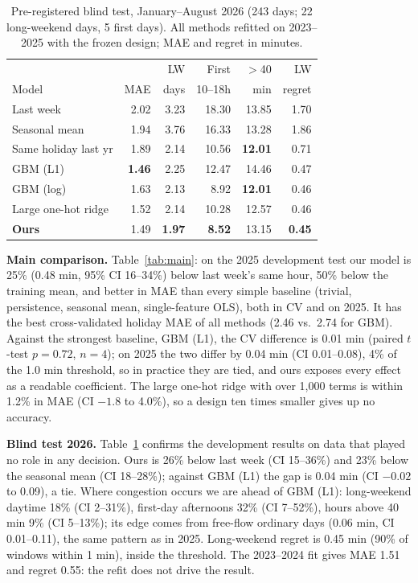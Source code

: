 \documentclass[11pt]{article}
\newcommand{\tb}{\footnotesize}
\begin{document}
\begin{table}[t]\tb\centering\setlength{\tabcolsep}{2.2pt}
\begin{tabular}{@{}lrrrrr@{}}
\toprule & & LW & First & $>$40 & LW\\
Model & MAE & days & 10--18h & min & regret\\\midrule
Last week & 2.02 & 3.23 & 18.30 & 13.85 & 1.70\\
Seasonal mean & 1.94 & 3.76 & 16.33 & 13.28 & 1.86\\
Same holiday last yr & 1.89 & 2.14 & 10.56 & \textbf{12.01} & 0.71\\
GBM (L1) & \textbf{1.46} & 2.25 & 12.47 & 14.46 & 0.47\\
GBM (log) & 1.63 & 2.13 & 8.92 & \textbf{12.01} & 0.46\\
Large one-hot ridge & 1.52 & 2.14 & 10.28 & 12.57 & 0.46\\
\textbf{Ours} & 1.49 & \textbf{1.97} & \textbf{8.52} & 13.15 & \textbf{0.45}\\\bottomrule
\end{tabular}
\caption{Pre-registered blind test, January--August 2026 (243 days; 22 long-weekend days, 5 first days). All methods refitted on 2023--2025 with the frozen design; MAE and regret in minutes.}\label{tab:blind}
\end{table}
\textbf{Main comparison.} Table~\ref{tab:main}: on the 2025 development test our model is 25\% (0.48 min, 95\% CI 16--34\%) below last week's same hour, 50\% below the training mean, and better in MAE than every simple baseline (trivial, persistence, seasonal mean, single-feature OLS), both in CV and on 2025. It has the best cross-validated holiday MAE of all methods (2.46 vs.\ 2.74 for GBM). Against the strongest baseline, GBM (L1), the CV difference is 0.01 min (paired $t$-test $p{=}0.72$, $n{=}4$); on 2025 the two differ by 0.04 min (CI 0.01--0.08), 4\% of the 1.0 min threshold, so in practice they are tied, and ours exposes every effect as a readable coefficient. The large one-hot ridge with over 1,000 terms is within 1.2\% in MAE (CI $-1.8$ to 4.0\%), so a design ten times smaller gives up no accuracy.

\noindent\textbf{Blind test 2026.} Table~\ref{tab:blind} confirms the development results on data that played no role in any decision. Ours is 26\% below last week (CI 15--36\%) and 23\% below the seasonal mean (CI 18--28\%); against GBM (L1) the gap is 0.04 min (CI $-0.02$ to 0.09), a tie. Where congestion occurs we are ahead of GBM (L1): long-weekend daytime 18\% (CI 2--31\%), first-day afternoons 32\% (CI 7--52\%), hours above 40 min 9\% (CI 5--13\%); its edge comes from free-flow ordinary days (0.06 min, CI 0.01--0.11), the same pattern as in 2025. Long-weekend regret is 0.45 min (90\% of windows within 1 min), inside the threshold. The 2023--2024 fit gives MAE 1.51 and regret 0.55: the refit does not drive the result.
\end{document}
